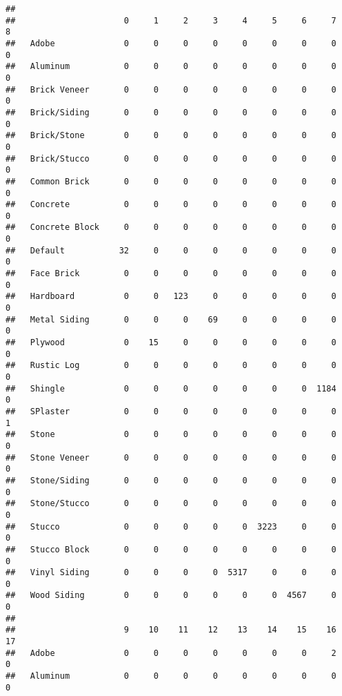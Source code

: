 \documentclass[]{article}
\newenvironment{Shaded}{\begin{snugshade}}{\end{snugshade}}
\newcommand{\KeywordTok}[1]{\textcolor[rgb]{0.13,0.29,0.53}{\textbf{#1}}}
\newcommand{\NormalTok}[1]{#1}
\newcommand{\OperatorTok}[1]{\textcolor[rgb]{0.81,0.36,0.00}{\textbf{#1}}}
\begin{document}
\begin{Shaded}
\end{Shaded}

\begin{verbatim}
##                 
##                      0     1     2     3     4     5     6     7     8
##   Adobe              0     0     0     0     0     0     0     0     0
##   Aluminum           0     0     0     0     0     0     0     0     0
##   Brick Veneer       0     0     0     0     0     0     0     0     0
##   Brick/Siding       0     0     0     0     0     0     0     0     0
##   Brick/Stone        0     0     0     0     0     0     0     0     0
##   Brick/Stucco       0     0     0     0     0     0     0     0     0
##   Common Brick       0     0     0     0     0     0     0     0     0
##   Concrete           0     0     0     0     0     0     0     0     0
##   Concrete Block     0     0     0     0     0     0     0     0     0
##   Default           32     0     0     0     0     0     0     0     0
##   Face Brick         0     0     0     0     0     0     0     0     0
##   Hardboard          0     0   123     0     0     0     0     0     0
##   Metal Siding       0     0     0    69     0     0     0     0     0
##   Plywood            0    15     0     0     0     0     0     0     0
##   Rustic Log         0     0     0     0     0     0     0     0     0
##   Shingle            0     0     0     0     0     0     0  1184     0
##   SPlaster           0     0     0     0     0     0     0     0     1
##   Stone              0     0     0     0     0     0     0     0     0
##   Stone Veneer       0     0     0     0     0     0     0     0     0
##   Stone/Siding       0     0     0     0     0     0     0     0     0
##   Stone/Stucco       0     0     0     0     0     0     0     0     0
##   Stucco             0     0     0     0     0  3223     0     0     0
##   Stucco Block       0     0     0     0     0     0     0     0     0
##   Vinyl Siding       0     0     0     0  5317     0     0     0     0
##   Wood Siding        0     0     0     0     0     0  4567     0     0
##                 
##                      9    10    11    12    13    14    15    16    17
##   Adobe              0     0     0     0     0     0     0     2     0
##   Aluminum           0     0     0     0     0     0     0     0     0

\end{verbatim}
\end{document}
